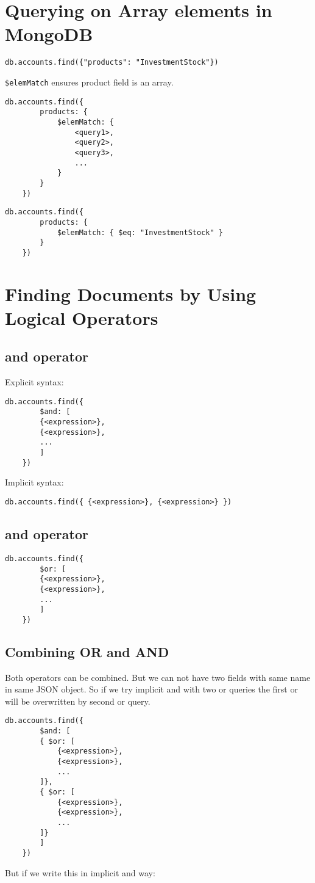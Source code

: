 \documentclass[../main.tex]{subfiles}
\begin{document}
\section{Querying on Array elements in MongoDB}
\begin{lstlisting}[language=MongoDB]
	db.accounts.find({"products": "InvestmentStock"})
\end{lstlisting}

\lstinline{$elemMatch} ensures product field is an array.

\begin{lstlisting}[language=MongoDB, caption=elemMatch operator]
	db.accounts.find({
		products: {
			$elemMatch: {
				<query1>,
				<query2>,
				<query3>,
				...
			}
		}
	})
\end{lstlisting}


\begin{lstlisting}[language=MongoDB]
	db.accounts.find({
		products: {
			$elemMatch: { $eq: "InvestmentStock" }
		}
	})
\end{lstlisting}


\section{Finding Documents by Using Logical Operators}
\subsection{and operator}
Explicit syntax:
\begin{lstlisting}[language=MongoDB,caption=and operator explicit]
	db.accounts.find({
		$and: [
		{<expression>},
		{<expression>},
		...
		]
	})
\end{lstlisting}

Implicit syntax:
\begin{lstlisting}[language=MongoDB, caption=and operator implicit]
	db.accounts.find({ {<expression>}, {<expression>} })
\end{lstlisting}

\subsection{and operator}
\begin{lstlisting}[language=MongoDB,caption=or operator]
	db.accounts.find({
		$or: [
		{<expression>},
		{<expression>},
		...
		]
	})
\end{lstlisting}

\subsection{Combining OR and AND}
Both operators can be combined. 
But we can not have two fields with same name in same \gls{JSON} object.
So if we try implicit and with two or queries the first or will be overwritten by second or query.
\begin{lstlisting}[language=MongoDB]
	db.accounts.find({
		$and: [
		{ $or: [
			{<expression>},
			{<expression>},
			...
		]},
		{ $or: [
			{<expression>},
			{<expression>},
			...
		]}
		]
	})
\end{lstlisting}
But if we write this in implicit and way: 
\end{document}
